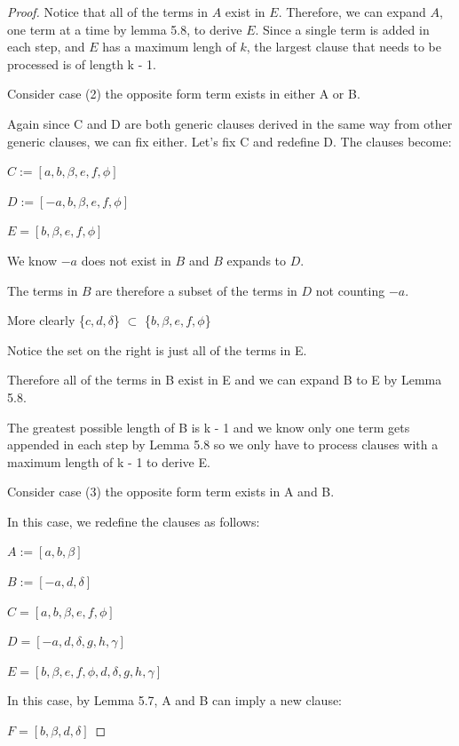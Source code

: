 \documentclass[manuscript]{acmart}
\begin{document}
\begin{proof}
        Notice that all of the terms in $A$ exist in $E$. Therefore, we
        can expand $A$, one term at a time by lemma 5.8, to derive
        $E$. Since a single term is added in each step, and $E$ has a maximum lengh of $k$,
        the largest clause that needs to be processed is of length k - 1.

        Consider case (2) the opposite form term exists in either A or B.

        Again since C and D are both generic clauses derived in the same
        way from other generic clauses, we can fix either. Let's fix C
        and redefine D. The clauses become:

        $C := [a, b, \beta, e, f, \phi]$

        $D := [-a, b, \beta, e, f, \phi]$

        $E = [b, \beta, e, f, \phi]$

        We know $-a$ does not exist in $B$ and $B$ expands to $D$.

        The terms in $B$ are therefore a subset of the terms in $D$ not counting
        $-a$.

        More clearly \{$c, d, \delta$\} $\subset$ \{$b, \beta, e, f, \phi$\}

        Notice the set on the right is just all of the terms in E.

        Therefore all of the terms in B exist in E and we can expand
        B to E by Lemma 5.8.

        The greatest possible length of B is k - 1 and we know only one
        term gets appended in each step by Lemma 5.8 so we only have to
        process clauses with a maximum length of k - 1 to derive E.

        Consider case (3) the opposite form term exists in A and B.

        In this case, we redefine the clauses as follows:

        $A := [a, b, \beta]$

        $B := [-a, d, \delta]$

        $C = [a, b, \beta, e, f, \phi]$

        $D = [-a, d, \delta, g, h, \gamma]$

        $E = [b, \beta, e, f, \phi, d, \delta, g, h, \gamma]$

        In this case, by Lemma 5.7, A and B can imply a new clause:

        $F = [b, \beta, d, \delta]$


\end{proof}
\end{document}

